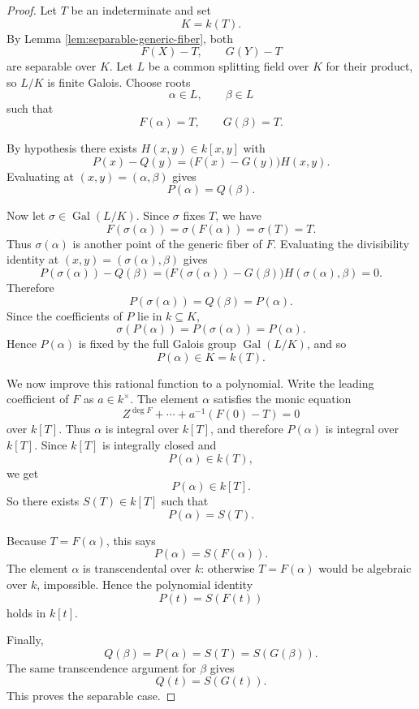 \documentclass[12pt]{article}
\newcommand{\Galois}{\operatorname{Gal}}
\begin{document}
\begin{proof}
Let \(T\) be an indeterminate and set
\[
    K=k(T).
\]
By Lemma \ref{lem:separable-generic-fiber}, both
\[
    F(X)-T,
    \qquad
    G(Y)-T
\]
are separable over \(K\).  Let \(L\) be a common splitting field over \(K\) for their product, so \(L/K\) is finite Galois.  Choose roots
\[
    \alpha\in L,
    \qquad
    \beta\in L
\]
such that
\[
    F(\alpha)=T,
    \qquad
    G(\beta)=T.
\]

By hypothesis there exists \(H(x,y)\in k[x,y]\) with
\[
    P(x)-Q(y)=\bigl(F(x)-G(y)\bigr)H(x,y).
\]
Evaluating at \((x,y)=(\alpha,\beta)\) gives
\[
    P(\alpha)=Q(\beta).
\]

Now let \(\sigma\in \Galois(L/K)\).  Since \(\sigma\) fixes \(T\), we have
\[
    F(\sigma(\alpha))=\sigma(F(\alpha))=\sigma(T)=T.
\]
Thus \(\sigma(\alpha)\) is another point of the generic fiber of \(F\).  Evaluating the divisibility identity at \((x,y)=(\sigma(\alpha),\beta)\) gives
\[
    P(\sigma(\alpha))-Q(\beta)
    =
    \bigl(F(\sigma(\alpha))-G(\beta)\bigr)H(\sigma(\alpha),\beta)
    =0.
\]
Therefore
\[
    P(\sigma(\alpha))=Q(\beta)=P(\alpha).
\]
Since the coefficients of \(P\) lie in \(k\subseteq K\),
\[
    \sigma(P(\alpha))=P(\sigma(\alpha))=P(\alpha).
\]
Hence \(P(\alpha)\) is fixed by the full Galois group \(\Galois(L/K)\), and so
\[
    P(\alpha)\in K=k(T).
\]

We now improve this rational function to a polynomial.  Write the leading coefficient of \(F\) as \(a\in k^\times\).  The element \(\alpha\) satisfies the monic equation
\[
    Z^{\deg F}+\cdots+a^{-1}(F(0)-T)=0
\]
over \(k[T]\).  Thus \(\alpha\) is integral over \(k[T]\), and therefore \(P(\alpha)\) is integral over \(k[T]\).  Since \(k[T]\) is integrally closed and
\[
    P(\alpha)\in k(T),
\]
we get
\[
    P(\alpha)\in k[T].
\]
So there exists \(S(T)\in k[T]\) such that
\[
    P(\alpha)=S(T).
\]

Because \(T=F(\alpha)\), this says
\[
    P(\alpha)=S(F(\alpha)).
\]
The element \(\alpha\) is transcendental over \(k\): otherwise \(T=F(\alpha)\) would be algebraic over \(k\), impossible.  Hence the polynomial identity
\[
    P(t)=S(F(t))
\]
holds in \(k[t]\).

Finally,
\[
    Q(\beta)=P(\alpha)=S(T)=S(G(\beta)).
\]
The same transcendence argument for \(\beta\) gives
\[
    Q(t)=S(G(t)).
\]
This proves the separable case.
\end{proof}
\end{document}
